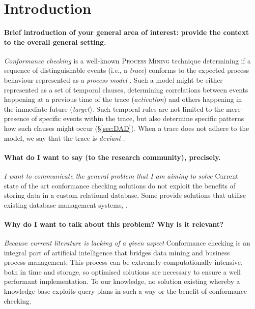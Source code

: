 \section{Introduction}

\paragraph*{Brief introduction of your general area of interest: provide the \textbf{context} to the overall general setting.}
\textit{Conformance checking} is a well-known \textsc{Process Mining} technique determining if a sequence of distinguishable events (i.e., a \textit{trace}) conforms to the expected process behaviour represented as a \textit{process model} \cite{RozinatA08}. Such a model might be either represented as a set of temporal clauses, determining correlations between events happening at a previous time of the trace (\textit{activation}) and others happening in the immediate future (\textit{target}). Such temporal rules are not limited to the mere presence of specific events within the trace, but also determine specific patterns how such clauses might occur (\S\ref{sec:DAD}). When a trace does not adhere to the model, we say that the trace is \textit{deviant} \cite{bpm21}. \add{[TODO]}
\medskip

\paragraph*{What do I want to say (to the research community), precisely.} \textit{I want to communicate the general problem that I am aiming to solve} Current state of the art conformance checking solutions do not exploit the benefits of storing data in a custom relational database. Some provide solutions that utilise existing database management systems, .  

\paragraph*{Why do I want to talk about this problem? Why is it relevant?} \textit{Because current literature is lacking of a given aspect} Conformance checking is an integral part of artificial intelligence that bridges data mining and business process management.  This process can be extremely computationally intensive, both in time and storage, so optimised solutions are necessary to ensure a well performant implementation. To our knowledge, no solution existing whereby a knowledge base exploits query plans in such a way or the benefit of conformance checking. 
\medskip

